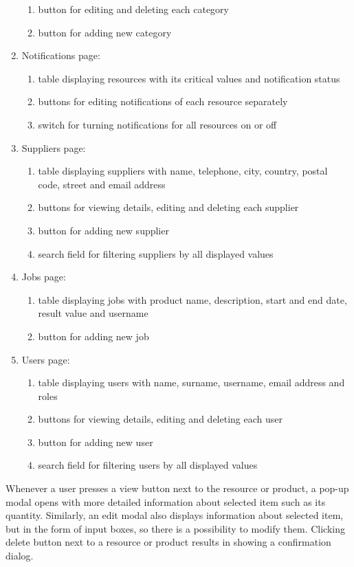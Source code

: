 \documentclass[a4paper,11pt,twoside]{report}
\theoremstyle{definition}
\begin{document}
\begin{enumerate}
\begin{enumerate}
\item button for editing and deleting each category
\item button for adding new category
\end{enumerate}
\item Notifications page: 
\begin{enumerate}
\item table displaying resources with its critical values and notification status
\item buttons for editing notifications of each resource separately
\item switch for turning notifications for all resources on or off
\end{enumerate}
\item Suppliers page:
\begin{enumerate}
\item table displaying suppliers with name, telephone, city, country,  postal code, street and email address 
\item buttons for viewing details, editing and deleting each supplier
\item button for adding new supplier
\item search field for filtering suppliers by all displayed values
\end{enumerate}
\item Jobs page:
\begin{enumerate}
\item table displaying jobs with product name, description, start and end date, result value and username
\item button for adding new job
\end{enumerate}
\item Users page:
\begin{enumerate}
\item table displaying users with name, surname, username, email address and roles
\item buttons for viewing details, editing and deleting each user
\item button for adding new user
\item search field for filtering users by all displayed values
\end{enumerate}
\end{enumerate}

Whenever a user presses a view button next to the resource or product, a pop-up modal opens with more detailed information about selected item such as its quantity. Similarly, an edit modal also displays information about selected item, but in the form of input boxes, so there is a possibility to modify them. Clicking delete button next to a resource or product results in showing a confirmation dialog.\\ \\
\end{document}
